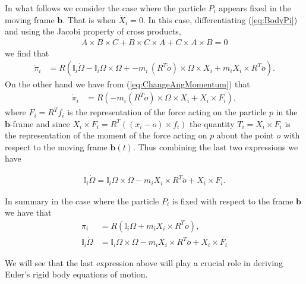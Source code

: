 \documentclass[graybox,envcountchap,sectrefs]{svmonoMuga}
\begin{document}
In what follows we consider the case where the particle $P_i$ appears fixed in the moving frame $\mathbf{b}$. That is when $\dot{X}_i=0$. In this case, differentiating (\ref{eq:BodyPi}) and using the Jacobi property of cross products, 
\begin{align*}
A\times B\times C+B\times C\times A+C\times A\times B=0
\end{align*} 
we find that
{\small
\begin{align*}
\dot{\pi}_i&=R\left(\mathbb{I}_i\dot{\Omega}-\mathbb{I}_i{\Omega}\times \Omega+-m_i\,(R^T\dot{o})\times\Omega\times X_i+m_iX_i\times R^T\ddot{o}\right).
\end{align*}
}
On the other hand we have from (\ref{eq:ChangeAngMomentum}) that 
\begin{align*}
\dot{\pi}_i&= R\left(-m_i(R^T\dot{o})\times \Omega \times {X}_i+X_i\times F_i\right),
\end{align*}
where $F_i=R^Tf_i$ is the representation of the force acting on the particle $p$ in the $\mathbf{b}$-frame and since $X_i\times F_i=R^T((x_i-o)\times f_i)$ the quantity $T_i=X_i\times F_i$ is the representation of the moment of the force acting on $p$ about the point $o$ with respect to the moving frame $\mathbf{b}(t)$. Thus combining the last two expressions we have

\begin{align}
\mathbb{I}_i\dot{\Omega}=\mathbb{I}_i\Omega \times \Omega -m_iX_i\times R^T\ddot{o}+X_i\times F_i.\label{eq:RateOfChangeBodyPi}
\end{align}

\begin{svgraybox}
In summary in the case where the particle $P_i$ is fixed with respect to the frame $\mathbf{b}$ we have that 
\begin{align*}
\pi_i&= R\left(\mathbb{I}_i\Omega+m_iX_i\times R^T\dot{o}\right),\\
\mathbb{I}_i\dot{\Omega}&=\mathbb{I}_i\Omega \times \Omega -m_iX_i\times R^T\ddot{o}+X_i\times F_i
\end{align*}
\end{svgraybox}
We will see that the last expression above will play a crucial role in deriving Euler's rigid body equations of motion.
\end{document}
